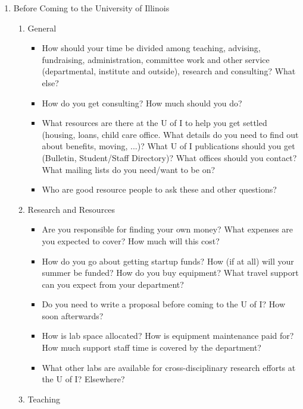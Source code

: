 \begin{enumerate}

\item
Before Coming to the  University of Illinois


\begin{enumerate}
\item
 General

\begin{itemize}
\item
	How should your time be divided among teaching, advising, fundraising, 
administration, committee work and other service (departmental, institute and 
outside), research and consulting?  What else?
\item
	How do you get consulting? How much should you do?
\item
	What resources are there at the U of I to help you get settled (housing, loans, child 
care office. What details do you need to find out about benefits, moving, ...)? What 
U of I publications should you get (Bulletin, Student/Staff Directory)?  What 
offices should you contact? What mailing lists do you need/want to be on?
\item
	Who are good resource people to ask these and other questions?
\end{itemize}

\item
 Research and Resources


\begin{itemize}
\item
	Are you responsible for finding your own money? What expenses are you 
expected to cover?  How much will this cost?
\item
	How do you go about getting startup funds? How (if at all) will your summer be 
funded? How do you buy equipment? What travel support can you expect from 
your department?
\item
	Do you need to write a proposal before coming to the U of I? How soon afterwards?
\item
	How is lab space allocated? How is equipment maintenance paid for? How much 
support staff time is covered by the department?
\item
	What other labs are available for cross-disciplinary research efforts at the U of I? 
Elsewhere?
\end{itemize}

\item
Teaching
\begin{itemize}


\end{itemize}
\end{enumerate}
\end{enumerate}
